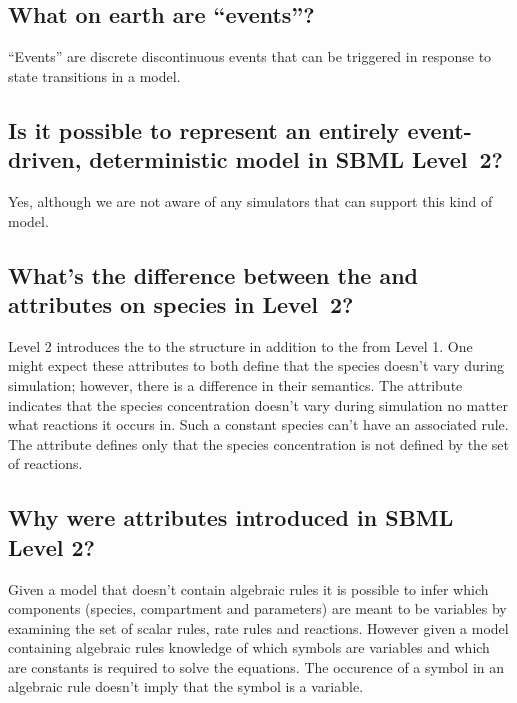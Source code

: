 \documentclass{sbmlfaq}
\begin{document}
\subsection{What on earth are ``events''?}

``Events'' are discrete discontinuous events that can be triggered in
response to state transitions in a model.


\subsection{Is it possible to represent an entirely
  event-driven, deterministic model in SBML Level~2?} 

Yes, although we are not aware of any simulators that can support this kind
of model.


\subsection{What's the difference between the \textup{}
  and \textup{} attributes on species in Level~2?}

Level 2 introduces the  to the  structure
in addition to the  from Level 1.  One might
expect these attributes to both define that the species doesn't vary during
simulation; however, there is a difference in their semantics.  The
 attribute indicates that the species concentration
doesn't vary during simulation no matter what reactions it occurs in.  Such
a constant species can't have an associated rule.  The
 attribute defines only that the species
concentration is not defined by the set of reactions.


\subsection{Why were  attributes introduced in SBML Level 2?}

Given a model that doesn't contain algebraic rules it is possible to infer 
which components (species, compartment and parameters) are meant to be variables
by examining the set of scalar rules, rate rules and reactions.
However given a model
containing algebraic rules knowledge of which symbols are
variables and which are constants is required to solve the equations.
The occurence of a symbol in an algebraic rule doesn't imply that
the symbol is a variable.   
\end{document}
